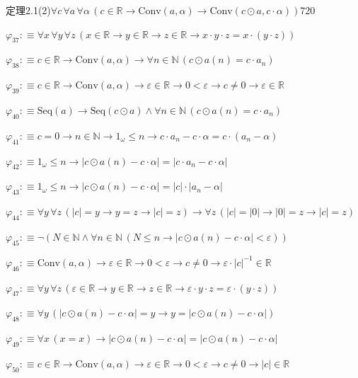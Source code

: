 \begin{fullproof}{定理2.1(2)}{$\forall c\,\forall a\,\forall \alpha\,(c \in \mathbb{R} \to \mathrm{Conv}(a,\alpha) \to \mathrm{Conv}(c \odot a,c \cdot \alpha))$}{720}
\begin{abbrevlist}
\item $\varphi_{37} :\equiv \forall x\,\forall y\,\forall z\,(x \in \mathbb{R} \to y \in \mathbb{R} \to z \in \mathbb{R} \to x \cdot y \cdot z = x \cdot (y \cdot z))$
\item $\varphi_{38} :\equiv c \in \mathbb{R} \to \mathrm{Conv}(a,\alpha) \to \forall n \in \mathbb{N}\,(c \odot a(n) = c \cdot a_{n})$
\item $\varphi_{39} :\equiv c \in \mathbb{R} \to \mathrm{Conv}(a,\alpha) \to \varepsilon \in \mathbb{R} \to 0 < \varepsilon \to c \neq 0 \to \varepsilon \in \mathbb{R}$
\item $\varphi_{40} :\equiv \mathrm{Seq}(a) \to \mathrm{Seq}(c \odot a) \land \forall n \in \mathbb{N}\,(c \odot a(n) = c \cdot a_{n})$
\item $\varphi_{41} :\equiv c = 0 \to n \in \mathbb{N} \to 1_{\omega} \leq n \to c \cdot a_{n} - c \cdot \alpha = c \cdot (a_{n} - \alpha)$
\item $\varphi_{42} :\equiv 1_{\omega} \leq n \to \lvert c \odot a(n) - c \cdot \alpha \rvert = \lvert c \cdot a_{n} - c \cdot \alpha \rvert$
\item $\varphi_{43} :\equiv 1_{\omega} \leq n \to \lvert c \odot a(n) - c \cdot \alpha \rvert = \lvert c \rvert \cdot \lvert a_{n} - \alpha \rvert$
\item $\varphi_{44} :\equiv \forall y\,\forall z\,(\lvert c \rvert = y \to y = z \to \lvert c \rvert = z) \to \forall z\,(\lvert c \rvert = \lvert 0 \rvert \to \lvert 0 \rvert = z \to \lvert c \rvert = z)$
\item $\varphi_{45} :\equiv \neg (N \in \mathbb{N} \land \forall n \in \mathbb{N}\,(N \leq n \to \lvert c \odot a(n) - c \cdot \alpha \rvert < \varepsilon))$
\item $\varphi_{46} :\equiv \mathrm{Conv}(a,\alpha) \to \varepsilon \in \mathbb{R} \to 0 < \varepsilon \to c \neq 0 \to \varepsilon \cdot \lvert c \rvert^{-1} \in \mathbb{R}$
\item $\varphi_{47} :\equiv \forall y\,\forall z\,(\varepsilon \in \mathbb{R} \to y \in \mathbb{R} \to z \in \mathbb{R} \to \varepsilon \cdot y \cdot z = \varepsilon \cdot (y \cdot z))$
\item $\varphi_{48} :\equiv \forall y\,(\lvert c \odot a(n) - c \cdot \alpha \rvert = y \to y = \lvert c \odot a(n) - c \cdot \alpha \rvert)$
\item $\varphi_{49} :\equiv \forall x\,(x = x) \to \lvert c \odot a(n) - c \cdot \alpha \rvert = \lvert c \odot a(n) - c \cdot \alpha \rvert$
\item $\varphi_{50} :\equiv c \in \mathbb{R} \to \mathrm{Conv}(a,\alpha) \to \varepsilon \in \mathbb{R} \to 0 < \varepsilon \to c \neq 0 \to \lvert c \rvert \in \mathbb{R}$

\end{abbrevlist}
\end{fullproof}
